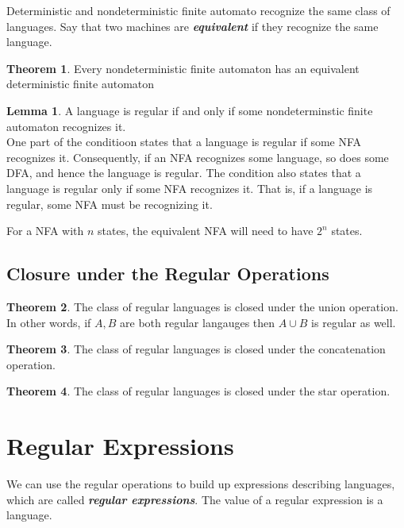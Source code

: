 \documentclass{article}
\theoremstyle{definition}
\newtheorem{theorem}{Theorem}[section]
\newtheorem{lemma}{Lemma}
\newcommand{\define}[1]{\textbf{\textit{#1}}}
\begin{document}
Deterministic and nondeterministic finite automato recognize the same class of languages. Say that two machines are \define{equivalent} if they recognize the same language. 

\begin{theorem}
  Every nondeterministic finite automaton has an equivalent deterministic finite automaton
\end{theorem}

\begin{lemma}
  A language is regular if and only if some nondeterminstic finite automaton recognizes it. \\ 
  One part of the conditioon states that a language is regular if some NFA recognizes it. Consequently, if an NFA recognizes some language, so does some DFA, and hence the language is regular. The condition also states that a language is regular only if some NFA recognizes it. That is, if a language is regular, some NFA must be recognizing it. 
\end{lemma}

For a NFA with $n$ states, the equivalent NFA will need to have $2^{n}$ states. 

\subsection{Closure under the Regular Operations}

\begin{theorem}
  The class of regular languages is closed under the union operation. In other words, if $A,B$ are both regular langauges then $A \cup B$ is regular as well.  
\end{theorem}

\begin{theorem}
  The class of regular languages is closed under the concatenation operation. 
\end{theorem}

\begin{theorem}
  The class of regular languages is closed under the star operation. 
\end{theorem}

\section{Regular Expressions} 

We can use the regular operations to build up expressions describing languages, which are called \define{regular expressions}. The value of a regular expression is a language. 
\end{document}
